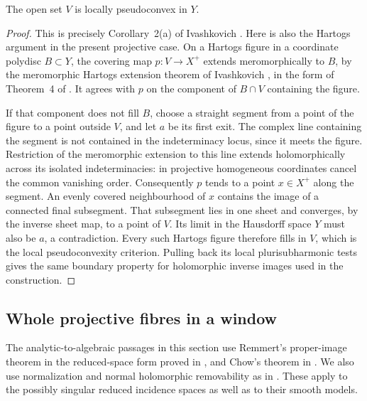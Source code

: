\begin{lemma}\label{quo:pseudoconvex}
The open set \(V\) is locally pseudoconvex in \(Y\).
\end{lemma}
\begin{proof}
This is precisely Corollary~2(a) of Ivashkovich
\cite{Ivashkovich2008}. Here is also the Hartogs argument in the
present projective case. On a Hartogs figure in a coordinate polydisc
\(B\subset Y\), the covering map \(p:V\to X^+\) extends
meromorphically to \(B\), by the meromorphic Hartogs extension
theorem of Ivashkovich \cite{Ivashkovich1992}, in the form of
Theorem~4 of \cite{Ivashkovich2008}. It agrees with \(p\) on the
component of \(B\cap V\) containing the figure.

If that component does not fill \(B\), choose a straight segment
from a point of the figure to a point outside \(V\), and let \(a\)
be its first exit. The complex line containing the segment is not
contained in the indeterminacy locus, since it meets the figure.
Restriction of the meromorphic extension to this line extends
holomorphically across its isolated indeterminacies: in projective
homogeneous coordinates cancel the common vanishing order.
Consequently \(p\) tends to a point \(x\in X^+\) along the segment.
An evenly covered neighbourhood of \(x\) contains the image of a
connected final subsegment. That subsegment lies in one sheet and
converges, by the inverse sheet map, to a point of \(V\). Its limit
in the Hausdorff space \(Y\) must also be \(a\), a contradiction.
Every such Hartogs figure therefore fills in \(V\), which is the
local pseudoconvexity criterion. Pulling back its local
plurisubharmonic tests gives the same boundary property for
holomorphic inverse images used in the construction.
\end{proof}

\subsection{Whole projective fibres in a window}

The analytic-to-algebraic passages in this section use Remmert's
proper-image theorem in the reduced-space form proved in
\cite[\S7, Satz~1]{Grauert1960}, and Chow's theorem in
\cite[Proposition~13]{Serre1956}. We also use normalization and
normal holomorphic removability as in
\cite[II.7.3, II.7.12 and Remark~II.7.14]{Demailly2012}.
These apply to the possibly singular reduced incidence spaces as well
as to their smooth models.

